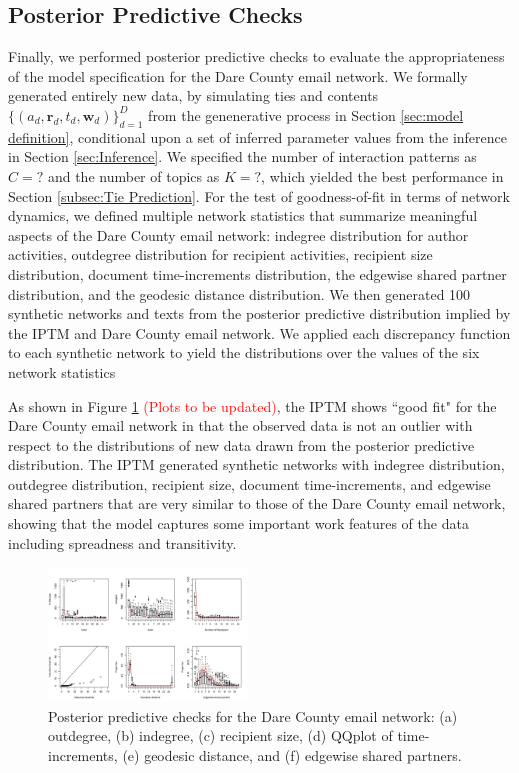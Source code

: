 \documentclass{article}
\begin{document}
\subsection{Posterior Predictive Checks}\label{subsec:PPC}
Finally, we performed posterior predictive checks \cite{rubin1984bayesianly} to evaluate the appropriateness of the model specification for the Dare County email network. We formally generated entirely new data, by simulating ties and contents $\{(a_{d}, \boldsymbol{r}_{d}, t_{d}, \boldsymbol{w}_{d})\}_{d=1}^D$ from the genenerative process in Section \ref{sec:model definition}, conditional upon a set of inferred parameter values from the inference in Section \ref{sec:Inference}. We specified the number of interaction patterns as $C=?$ and the number of topics as $K = ?$, which yielded the best performance in Section \ref{subsec:Tie Prediction}. For the test of goodness-of-fit in terms of network dynamics, we defined multiple network statistics that summarize meaningful aspects of the Dare County email network: indegree distribution for author activities, outdegree distribution for recipient activities, recipient size distribution, document time-increments distribution, the edgewise shared partner distribution, and the geodesic distance distribution. We then generated 100 synthetic networks and texts from the posterior predictive distribution implied by the IPTM and Dare County email network.
We applied each discrepancy function to each synthetic network to yield the distributions over the values of the six network statistics

As shown in Figure \ref{fig:PPC} \textcolor{red}{(Plots to be updated)}, the IPTM shows ``good fit" for the Dare County email network in that the observed data is not an outlier with respect to the distributions of new data drawn from the posterior predictive distribution. The IPTM generated synthetic networks with indegree distribution, outdegree distribution, recipient size, document time-increments, and edgewise shared partners that are very similar to those of the Dare County email network, showing that the model captures some important work features of the data including spreadness and transitivity. 
\begin{figure}[tb]
	\centering
	\includegraphics[width = 0.47\textwidth]{plots/PPC_plot-1.png}
	\caption{Posterior predictive checks for the Dare County email network: (a) outdegree, (b) indegree, (c) recipient size, (d) QQplot of time-increments, (e) geodesic distance, and (f) edgewise shared partners.}
	\label{fig:PPC}
\end{figure}
\end{document}
